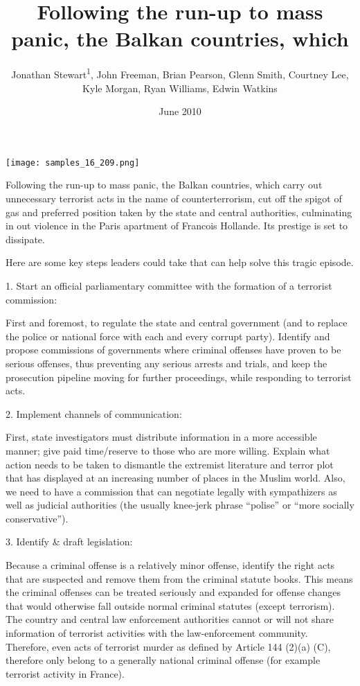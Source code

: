 \documentclass{article}
\title{Following the run-up to mass panic, the Balkan countries, which}
\author{Jonathan Stewart\textsuperscript{1},  John Freeman,  Brian Pearson,  Glenn Smith,  Courtney Lee,  Kyle Morgan,  Ryan Williams,  Edwin Watkins}
\affil{\textsuperscript{1}University of Perugia}
\date{June 2010}
\begin{document}
\maketitle

\begin{center}
\begin{minipage}{0.75\linewidth}
\texttt{[image: samples\_16\_209.png]}
\end{minipage}
\end{center}

Following the run-up to mass panic, the Balkan countries, which carry out unnecessary terrorist acts in the name of counterterrorism, cut off the spigot of gas and preferred position taken by the state and central authorities, culminating in out violence in the Paris apartment of Francois Hollande. Its prestige is set to dissipate.

Here are some key steps leaders could take that can help solve this tragic episode.

1. Start an official parliamentary committee with the formation of a terrorist commission:

First and foremost, to regulate the state and central government (and to replace the police or national force with each and every corrupt party). Identify and propose commissions of governments where criminal offenses have proven to be serious offenses, thus preventing any serious arrests and trials, and keep the prosecution pipeline moving for further proceedings, while responding to terrorist acts.

2. Implement channels of communication:

First, state investigators must distribute information in a more accessible manner; give paid time/reserve to those who are more willing. Explain what action needs to be taken to dismantle the extremist literature and terror plot that has displayed at an increasing number of places in the Muslim world. Also, we need to have a commission that can negotiate legally with sympathizers as well as judicial authorities (the usually knee-jerk phrase “polise” or “more socially conservative”).

3. Identify \& draft legislation:

Because a criminal offense is a relatively minor offense, identify the right acts that are suspected and remove them from the criminal statute books. This means the criminal offenses can be treated seriously and expanded for offense changes that would otherwise fall outside normal criminal statutes (except terrorism). The country and central law enforcement authorities cannot or will not share information of terrorist activities with the law-enforcement community. Therefore, even acts of terrorist murder as defined by Article 144 (2)(a) (C), therefore only belong to a generally national criminal offense (for example terrorist activity in France).
\end{document}
